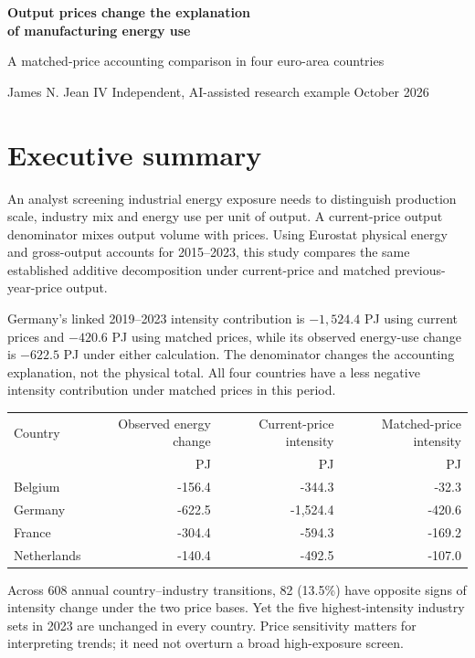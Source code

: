 \documentclass[11pt,letterpaper]{article}
\begin{document}
{\LARGE\bfseries Output prices change the explanation\\of manufacturing energy use\par}
\vspace{8pt}
{\large A matched-price accounting comparison in four euro-area countries\par}
{\small James N. Jean IV \quad Independent, AI-assisted research example  October 2026\par}
\section*{Executive summary}
An analyst screening industrial energy exposure needs to distinguish production scale, industry mix and energy use per unit of output. A current-price output denominator mixes output volume with prices. Using Eurostat physical energy and gross-output accounts for 2015--2023, this study compares the same established additive decomposition under current-price and matched previous-year-price output.

Germany's linked 2019--2023 intensity contribution is $-1{,}524.4$ PJ using current prices and $-420.6$ PJ using matched prices, while its observed energy-use change is $-622.5$ PJ under either calculation. The denominator changes the accounting explanation, not the physical total. All four countries have a less negative intensity contribution under matched prices in this period.

\begin{center}\small
\begin{tabular}{lrrr}\toprule
Country & Observed energy change & Current-price intensity & Matched-price intensity\\
 & PJ & PJ & PJ\\\midrule
Belgium & -156.4 & -344.3 & -32.3\\
Germany & -622.5 & -1,524.4 & -420.6\\
France & -304.4 & -594.3 & -169.2\\
Netherlands & -140.4 & -492.5 & -107.0\\\bottomrule
\end{tabular}
\end{center}

Across 608 annual country--industry transitions, 82 (13.5\%) have opposite signs of intensity change under the two price bases. Yet the five highest-intensity industry sets in 2023 are unchanged in every country. Price sensitivity matters for interpreting trends; it need not overturn a broad high-exposure screen.
\end{document}
